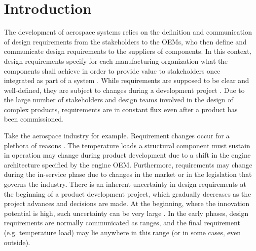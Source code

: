 \chapter{Introduction}
\label{ch:intro}

The development of aerospace systems relies on the definition and communication of design requirements from the stakeholders to the \acp{OEM}, who then define and communicate design requirements to the suppliers of components. In this context, design requirements specify for each manufacturing organization what the components shall achieve in order to provide value to stakeholders once integrated as part of a system \cite{Blanchard1981}. While requirements are supposed to be clear and well-defined, they are subject to changes during a development project \cite{Peterson2007}. Due to the large number of stakeholders and design teams involved in the design of complex products, requirements are in constant flux even after a product has been commissioned. 

Take the aerospace industry for example. Requirement changes occur for a plethora of reasons \cite{Boeing2013,Eckert2004}. The temperature loads a structural component must sustain in operation may change during product development due to a shift in the engine architecture specified by the engine \ac{OEM}. Furthermore, requirements may change during the in-service phase due to changes in the market or in the legislation that governs the industry. There is an inherent uncertainty in design requirements at the beginning of a product development project, which gradually decreases as the project advances and decisions are made. At the beginning, where the innovation potential is high, such uncertainty can be very large \cite{ullman2009mechanical}. In the early phases, design requirements are normally communicated as ranges, and the final requirement (e.g. temperature load) may lie anywhere in this range (or in some cases, even outside).

